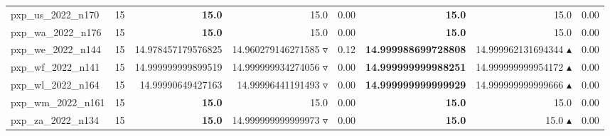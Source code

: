 \begin{table}[]
{\begin{tabular}{ll@{\hspace{1.2cm}}rrr@{\hspace{1.2cm}}rrr}
pxp_us_2022_n170 & 15 & \textbf{15.0} & 15.0 \phantom{$\blacktriangle$} & 0.00 & \textbf{15.0} & 15.0 \phantom{$\blacktriangle$} & 0.00 \\
pxp_wa_2022_n176 & 15 & \textbf{15.0} & 15.0 \phantom{$\blacktriangle$} & 0.00 & \textbf{15.0} & 15.0 \phantom{$\blacktriangle$} & 0.00 \\
pxp_we_2022_n144 & 15 & 14.978457179576825 & 14.960279146271585 $\triangledown$ & 0.12 & \textbf{14.999988699728808} & 14.999962131694344 $\blacktriangle$ & 0.00 \\
pxp_wf_2022_n141 & 15 & 14.999999999899519 & 14.999999934274056 $\triangledown$ & 0.00 & \textbf{14.999999999988251} & 14.999999999954172 $\blacktriangle$ & 0.00 \\
pxp_wl_2022_n164 & 15 & 14.99990649427163 & 14.99996441191493 $\triangledown$ & 0.00 & \textbf{14.999999999999929} & 14.999999999999666 $\blacktriangle$ & 0.00 \\
pxp_wm_2022_n161 & 15 & \textbf{15.0} & 15.0 \phantom{$\blacktriangle$} & 0.00 & \textbf{15.0} & 15.0 \phantom{$\blacktriangle$} & 0.00 \\
pxp_za_2022_n134 & 15 & \textbf{15.0} & 14.999999999999973 $\triangledown$ & 0.00 & \textbf{15.0} & 15.0 $\blacktriangle$ & 0.00 \\
\bottomrule
    \end{tabular}
    }
\end{table}
